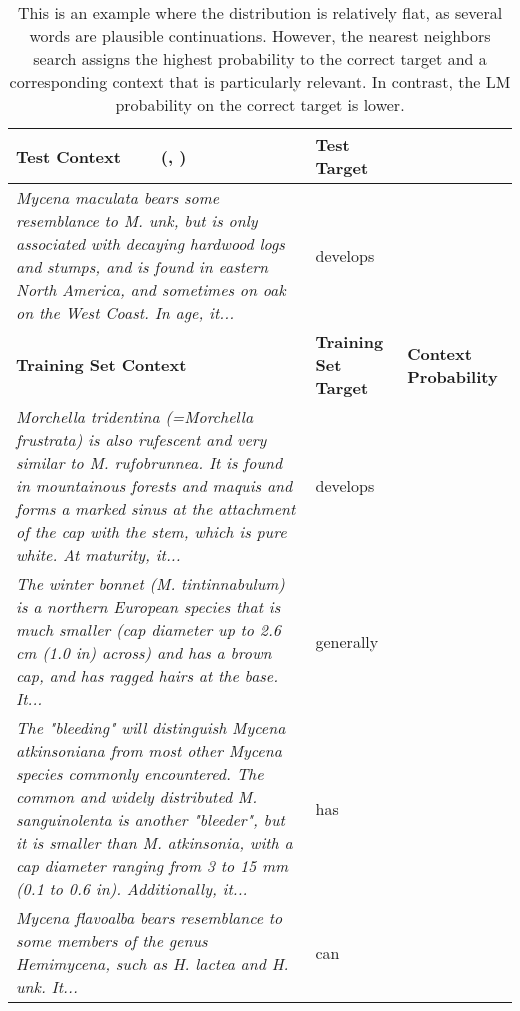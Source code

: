 \documentclass{article} \usepackage{iclr2020_conference,times}
\begin{document}
\begin{table}[t]
\centering
\small
\begin{tabular}{p{9.5cm}>{\centering\arraybackslash}m{1.6cm}>{\centering\arraybackslash}m{1.6cm}}
        \toprule[1.5pt]
\textbf{Test Context} ~~~ (, )         & \textbf{Test Target}        &                     \\ \midrule[0.75pt]
\emph{Mycena maculata bears some resemblance to M. unk, but is only associated with decaying hardwood logs and stumps, and is found in eastern North America, and sometimes on oak on the West Coast. In age, it...}                    & develops                    \\\addlinespace[0.15em]
                     \midrule[0.75pt]
\textbf{Training Set Context} & \textbf{Training Set Target} & \textbf{Context Probability} \\ 
                     \midrule[0.75pt]
\emph{Morchella tridentina (=Morchella frustrata) is also rufescent and very similar to M. rufobrunnea. It is found in mountainous forests and maquis and forms a marked sinus at the attachment of the cap with the stem, which is pure white. At maturity, it...}  &  develops        &  0.031                   \\\addlinespace[0.5em]\emph{The winter bonnet (M. tintinnabulum) is a northern European species that is much smaller (cap diameter up to 2.6 cm (1.0 in) across) and has a brown cap, and has ragged hairs at the base. It...}  &  generally        &  0.029                   \\\addlinespace[0.5em]\emph{The "bleeding" will distinguish Mycena atkinsoniana from most other Mycena species commonly encountered. The common and widely distributed M. sanguinolenta is another "bleeder", but it is smaller than M. atkinsonia, with a cap diameter ranging from 3 to 15 mm (0.1 to 0.6 in). Additionally, it...}  &  has        &  0.028                   \\\addlinespace[0.5em]\emph{Mycena flavoalba bears resemblance to some members of the genus Hemimycena, such as H. lactea and H. unk. It...}  &  can        &  0.018                  \\
\bottomrule[1.5pt]
\end{tabular}
    \caption{This is an example where the  distribution is relatively flat, as several words are plausible continuations. However, the nearest neighbors search assigns the highest probability to the correct target and a corresponding context that is particularly relevant. In contrast, the LM probability on the correct target is lower.}
    \label{table:app_output}
\end{table}

%
 
\end{document}
